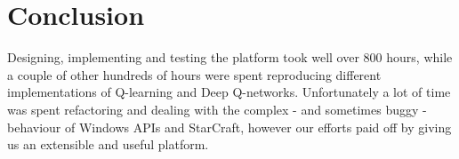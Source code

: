 
\chapter{Conclusion}

Designing, implementing and testing the platform took well over 800 hours, while
a couple of other hundreds of hours were spent reproducing different
implementations of Q-learning and Deep Q-networks. Unfortunately a lot of time
was spent refactoring and dealing with the complex - and sometimes buggy -
behaviour of Windows APIs and StarCraft, however our efforts paid off by giving
us an extensible and useful platform.
